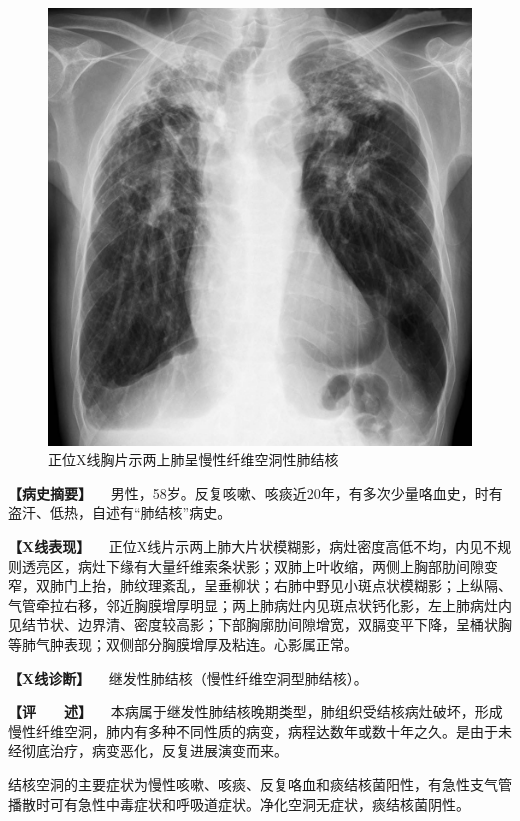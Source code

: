 \begin{figure}[!htbp]
 \centering
 \includegraphics{./images/Image00156.jpg}
 \captionsetup{justification=centering}
 \caption{正位X线胸片示两上肺呈慢性纤维空洞性肺结核}
 \label{fig3-5-4}
  \end{figure} 

\textbf{【病史摘要】}
　男性，58岁。反复咳嗽、咳痰近20年，有多次少量咯血史，时有盗汗、低热，自述有“肺结核”病史。

\textbf{【X线表现】}
　正位X线片示两上肺大片状模糊影，病灶密度高低不均，内见不规则透亮区，病灶下缘有大量纤维索条状影；双肺上叶收缩，两侧上胸部肋间隙变窄，双肺门上抬，肺纹理紊乱，呈垂柳状；右肺中野见小斑点状模糊影；上纵隔、气管牵拉右移，邻近胸膜增厚明显；两上肺病灶内见斑点状钙化影，左上肺病灶内见结节状、边界清、密度较高影；下部胸廓肋间隙增宽，双膈变平下降，呈桶状胸等肺气肿表现；双侧部分胸膜增厚及粘连。心影属正常。

\textbf{【X线诊断】} 　继发性肺结核（慢性纤维空洞型肺结核）。

\textbf{【评　　述】}
　本病属于继发性肺结核晚期类型，肺组织受结核病灶破坏，形成慢性纤维空洞，肺内有多种不同性质的病变，病程达数年或数十年之久。是由于未经彻底治疗，病变恶化，反复进展演变而来。

结核空洞的主要症状为慢性咳嗽、咳痰、反复咯血和痰结核菌阳性，有急性支气管播散时可有急性中毒症状和呼吸道症状。净化空洞无症状，痰结核菌阴性。

